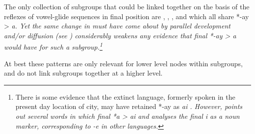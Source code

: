 
The only collection of subgroups that could be linked together
on the basis of the reflexes of vowel-glide sequences in final
position are , , , and  which
all share *-ay > \it{a}.
Yet the same change in  must have come about by parallel
development and/or diffusion (see ) considerably weakens
any evidence that final *-ay > \it{a} would have for such a subgroup.\footnote{
		There is some evidence that the extinct  language,
		formerly spoken in the present day location of  city,
		may have retained *-ay as \it{ai} \citep[138]{Stresemann1927}.
		However, \citet[86--87]{Collins1983} points out several words
		in which final *a > \it{ai}
		and analyses the final \it{i} as a noun marker,
		corresponding to \it{-e} in other  languages.}

At best these patterns are only relevant for lower level nodes
within subgroups, and do not link subgroups together at a higher level.

